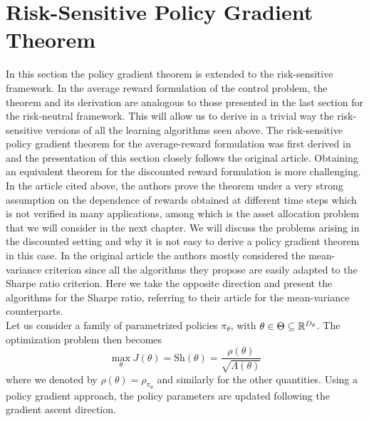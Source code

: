 \section{Risk-Sensitive Policy Gradient Theorem}
In this section the policy gradient theorem is extended to the risk-sensitive framework. In the average reward formulation of the control problem, the theorem and its derivation are analogous to those presented in the last section for the risk-neutral framework. This will allow us to derive in a trivial way the risk-sensitive versions of all the learning algorithms seen above. The risk-sensitive policy gradient theorem for the average-reward formulation was first derived in \cite{prashanth2014actor} and the presentation of this section closely follows the original article. Obtaining an equivalent theorem for the discounted reward formulation is more challenging. In the article cited above, the authors prove the theorem under a very strong assumption on the dependence of rewards obtained at different time steps which is not verified in many applications, among which is the asset allocation problem that we will consider in the next chapter. We will discuss the problems arising in the discounted setting and why it is not easy to derive a policy gradient theorem in this case. In the original article the authors mostly considered the mean-variance criterion since all the algorithms they propose are easily adapted to the Sharpe ratio criterion. Here we take the opposite direction and present the algorithms for the Sharpe ratio, referring to their article for the mean-variance counterparts.\\   
Let us consider a family of parametrized policies $\pi_\theta$, with $\theta
\in \Theta \subseteq \mathbb{R}^{D_\theta}$. The optimization problem then becomes
\begin{equation}
	\max_\theta J(\theta) =  \text{Sh}(\theta) = \frac{\rho(\theta)}{\sqrt{\Lambda(\theta)}}
\end{equation}
where we denoted by $\rho(\theta) = \rho_{\pi_\theta}$ and similarly for the other quantities. Using a policy gradient approach, the policy parameters are updated following the gradient ascent direction.

